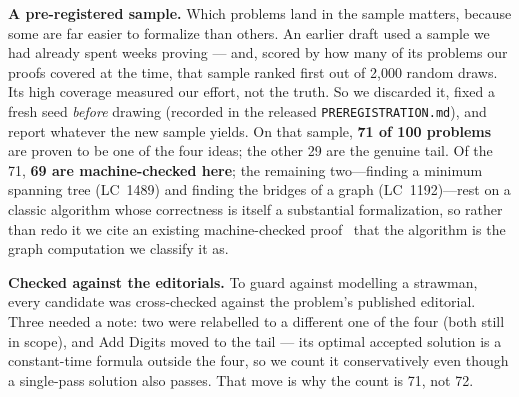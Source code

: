 \documentclass[11pt]{article}
\begin{document}
\textbf{A pre-registered sample.} Which problems land in the sample matters, because some are
far easier to formalize than others. An earlier draft used a sample we had already spent weeks
proving --- and, scored by how many of its problems our proofs covered at the time, that sample
ranked first out of 2{,}000 random draws. Its high coverage measured our effort, not the truth.
So we discarded it, fixed a fresh seed \emph{before} drawing (recorded in the released
\texttt{PREREGISTRATION.md}), and report whatever the new sample yields. On that sample,
\textbf{71 of 100 problems} are proven to be one of the four ideas; the other 29 are the genuine tail. Of the
71, \textbf{69 are machine-checked here}; the remaining two---finding a minimum spanning tree (LC~1489) and
finding the bridges of a graph (LC~1192)---rest on a classic algorithm whose correctness is itself a
substantial formalization, so
rather than redo it we cite an existing machine-checked proof~\cite{afp_kruskal,afp_dfs} that the algorithm
is the graph computation we classify it as.

\textbf{Checked against the editorials.} To guard against modelling a strawman, every
candidate was cross-checked against the problem's published editorial. Three needed a note:
two were relabelled to a different one of the four (both still in scope), and Add Digits moved
to the tail --- its optimal accepted solution is a constant-time formula outside the four, so
we count it conservatively even though a single-pass solution also passes. That move is why
the count is 71, not 72.
\end{document}
